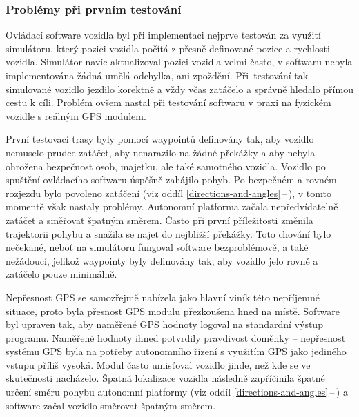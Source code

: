 \documentclass[czech, bachelor]{diploma}
\newcommand{\filipref}[1]{\ref{#1}\,--\,\nameref{#1}}
\begin{document}
\subsubsection{Problémy při prvním testování}

Ovládací software vozidla byl při implementaci nejprve testován za využití simulátoru, který pozici vozidla počítá z přesně
definované pozice a rychlosti vozidla. Simulátor navíc aktualizoval pozici vozidla velmi často, v softwaru nebyla implementována
žádná umělá odchylka, ani zpoždění. Při~testování tak simulované vozidlo jezdilo korektně a vždy včas zatáčelo a správně hledalo
přímou cestu k cíli. Problém ovšem nastal při testování softwaru v praxi na fyzickém vozidle s reálným GPS modulem.

První testovací trasy byly pomocí waypointů definovány tak, aby vozidlo nemuselo prudce zatáčet, aby nenarazilo na žádné překážky
a aby nebyla ohrožena bezpečnost osob, majetku, ale také samotného vozidla. Vozidlo po spuštění ovládacího softwaru úspěšně
zahájilo pohyb. Po bezpečném a rovném rozjezdu bylo povoleno zatáčení (viz oddíl \filipref{directions-and-angles}), v tomto
momentě však nastaly problémy. Autonomní platforma začala nepředvídatelně zatáčet a směřovat špatným směrem. Často při první
příležitosti změnila trajektorii pohybu a snažila se najet do nejbližší překážky. Toto chování bylo nečekané, neboť na simulátoru
fungoval software bezproblémově, a také nežádoucí, jelikož waypointy byly definovány tak, aby vozidlo jelo rovně a zatáčelo pouze
minimálně.

Nepřesnost GPS se samozřejmě nabízela jako hlavní viník této nepříjemné situace, proto byla přesnost GPS modulu přezkoušena hned
na místě. Software byl upraven tak, aby naměřené GPS hodnoty logoval na standardní výstup programu. Naměřené hodnoty ihned
potvrdily pravdivost doměnky -- nepřesnost systému GPS byla na potřeby autonomního řízení s využitím GPS jako jediného vstupu
příliš vysoká. Modul často umisťoval vozidlo jinde, než kde se ve skutečnosti nacházelo. Špatná lokalizace vozidla následně
zapříčinila špatné určení směru pohybu autonomní platformy (viz oddíl \filipref{directions-and-angles}) a software začal vozidlo
směrovat špatným směrem.
\end{document}
